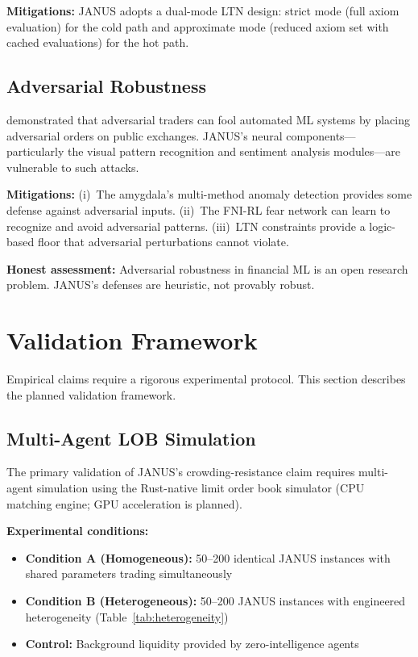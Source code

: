 \documentclass[12pt, a4paper]{article}
\begin{document}
\textbf{Mitigations:} JANUS adopts a dual-mode LTN design: strict mode (full axiom evaluation) for the cold path and approximate mode (reduced axiom set with cached evaluations) for the hot path.

\subsection{Adversarial Robustness}

\citet{goldblum2021adversarial} demonstrated that adversarial traders can fool automated ML systems by placing adversarial orders on public exchanges. JANUS's neural components---particularly the visual pattern recognition and sentiment analysis modules---are vulnerable to such attacks.

\textbf{Mitigations:} (i)~The amygdala's multi-method anomaly detection provides some defense against adversarial inputs. (ii)~The FNI-RL fear network can learn to recognize and avoid adversarial patterns. (iii)~LTN constraints provide a logic-based floor that adversarial perturbations cannot violate.

\textbf{Honest assessment:} Adversarial robustness in financial ML is an open research problem. JANUS's defenses are heuristic, not provably robust.

\section{Validation Framework}
\label{sec:validation}

Empirical claims require a rigorous experimental protocol. This section describes the planned validation framework.

\subsection{Multi-Agent LOB Simulation}

The primary validation of JANUS's crowding-resistance claim requires multi-agent simulation using the Rust-native limit order book simulator \citep{fu2024jaxlob} (CPU matching engine; GPU acceleration is planned).

\textbf{Experimental conditions:}
\begin{itemize}
	\item \textbf{Condition A (Homogeneous):} 50--200 identical JANUS instances with shared parameters trading simultaneously
	\item \textbf{Condition B (Heterogeneous):} 50--200 JANUS instances with engineered heterogeneity (Table~\ref{tab:heterogeneity})
	\item \textbf{Control:} Background liquidity provided by zero-intelligence agents \citep{farmer2005predictive}
\end{itemize}
\end{document}
